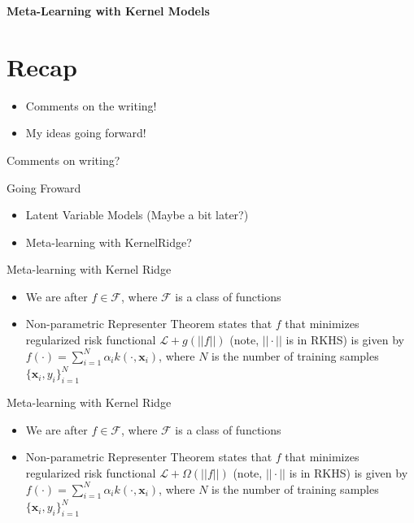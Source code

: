 \documentclass[aspectratio=169]{beamer}
\author{\authorlabel}
\newcommand{\mysubtitle}{\color{Pink}\Large{\textbf{Meta-Learning with Kernel Models}}}
\begin{document}



\begin{frame}
	\centering
	\mysubtitle
\end{frame}

\section{Recap}
\begin{frame}
  \begin{itemize}
    \item Comments on the writing!
    \item My ideas going forward!
  \end{itemize}
\end{frame}

\begin{frame}{}
  \centering
  \color{Pink}
  Comments on writing?
\end{frame}

\begin{frame}{Going Froward}
  \begin{itemize}
    \item Latent Variable Models (Maybe a bit later?)
    \item Meta-learning with KernelRidge?
  \end{itemize}
\end{frame}

\begin{frame}{Meta-learning with Kernel Ridge}
  \begin{itemize}
    \centering
  \item We are after $f\in \mathcal{F}$, where $\mathcal{F}$ is a class of functions 
  \item Non-parametric Representer Theorem states that $f$ that minimizes regularized risk functional $\mathcal{L}+g(||f||)$ (note, $||\cdot||$ is in RKHS) is given by $f(\cdot)=\sum_{i=1}^{N}\alpha_i k(\cdot,\mathbf{x}_i)$, where $N$ is the number of training samples $\{\mathbf{x}_i, y_i\}_{i=1}^{N}$
  \end{itemize}
\end{frame}

\begin{frame}{Meta-learning with Kernel Ridge}
  \begin{itemize}
    \centering
  \item We are after $f\in \mathcal{F}$, where $\mathcal{F}$ is a class of functions 
  \item Non-parametric Representer Theorem states that $f$ that minimizes regularized risk functional $\mathcal{L}+\Omega(||f||)$ (note, $||\cdot||$ is in RKHS) is given by $f(\cdot)=\sum_{i=1}^{N}\alpha_i k(\cdot,\mathbf{x}_i)$, where $N$ is the number of training samples $\{\mathbf{x}_i, y_i\}_{i=1}^{N}$
  \end{itemize}
\end{frame}
\end{document}
